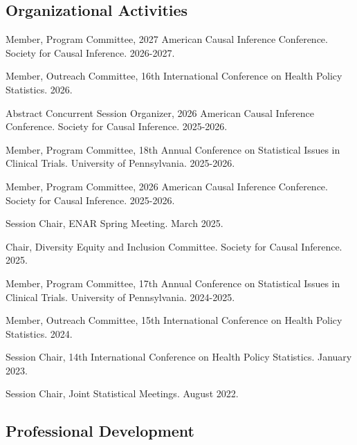 \documentclass[letterpaper,11pt]{article} %
\begin{document}
	\subsection*{Organizational Activities}
	\begin{etaremune}
        \item Member, Program Committee, 2027 American Causal Inference Conference. Society for Causal Inference. 2026-2027.
        \item Member, Outreach Committee, 16th International Conference on Health Policy Statistics. 2026.
        \item Abstract Concurrent Session Organizer, 2026 American Causal Inference Conference. Society for Causal Inference. 2025-2026.
		\item Member, Program Committee, 18th Annual Conference on Statistical Issues in Clinical Trials. University of Pennsylvania. 2025-2026.
		\item Member, Program Committee, 2026 American Causal Inference Conference. Society for Causal Inference. 2025-2026.
		\item Session Chair, ENAR Spring Meeting. March 2025.
		\item Chair, Diversity Equity and Inclusion Committee. Society for Causal Inference. 2025.
		\item Member, Program Committee, 17th Annual Conference on Statistical Issues in Clinical Trials. University of Pennsylvania. 2024-2025.
		\item Member, Outreach Committee, 15th International Conference on Health Policy Statistics. 2024.
		\item Session Chair, 14th International Conference on Health Policy Statistics. January 2023.
		\item Session Chair, Joint Statistical Meetings. August 2022.
	\end{etaremune}
	
	\subsection*{Professional Development}
	
\end{document}
